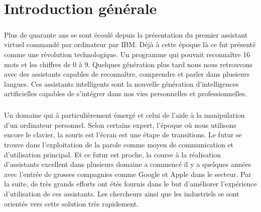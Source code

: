 \chapter*{Introduction générale}
\paragraph{}



\paragraph{}
Plus de quarante ans se sont écoulé depuis la présentation du premier assistant virtuel commandé par ordinateur par IBM. Déjà à cette époque là ce fut présenté comme une révolution technologique. Un programme qui pouvait reconnaître 16 mots et les chiffres de 0 à 9. Quelques génération plus tard nous nous retrouvons avec des assistants capables de reconnaître, comprendre et parler dans plusieurs langues. Ces assistants intelligents sont la nouvelle génération d'intelligences artificielles capables de s'intégrer dans nos vies personnelles et professionnelles. 

\paragraph{}
Un domaine qui à particulièrement émergé et celui de l'aide à la manipulation d'un ordinateur personnel. Selon certains expert, l'époque où nous utilisons encore le clavier, la souris est l'écran est une étape de transitions. Le futur se trouve dans l'exploitation de la parole comme moyen de communication et d'utilisation principal. Et ce futur est proche, la course à la réalisation d'assistants excellent dans plusieurs domaine a commencé il y a quelques années avec l'entrée de grosses compagnies comme Google et Apple dans le secteur. Par la suite, de très grands efforts ont étés fournis dans le but d'améliorer l'expérience d'utilisation de ces assistants. Les chercheurs ainsi que les industriels se sont orientés vers cette solution très rapidement.

